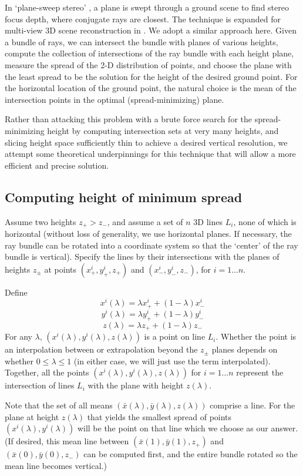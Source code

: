 \documentclass[10pt]{amsart}
\begin{document}
In `plane-sweep stereo' \cite{PLANE_SWEEP}, a plane is swept through a ground
scene to find stereo focus depth, where conjugate rays are closest. The
technique is expanded for multi-view 3D scene reconstruction in
\cite{PLANE_COLLINS}. We adopt a similar approach here. Given a bundle of rays,
we can intersect the bundle with planes of various heights, compute the
collection of intersections of the ray bundle with each height plane, measure
the spread of the 2-D distribution of points, and choose the plane with the
least spread to be the solution for the height of the desired ground point. For
the horizontal location of the ground point, the natural choice is the mean of
the intersection points in the optimal (spread-minimizing) plane.

Rather than attacking this problem with a brute force search for the
spread-minimizing height by computing intersection sets at very many heights,
and slicing height space sufficiently thin to achieve a desired vertical
resolution, we attempt some theoretical underpinnings for this technique that
will allow a more efficient and precise solution.

\subsection{Computing height of minimum spread\label{poly}}
Assume two heights $z_{+} > z_{-}$, and assume a set of $n$ 3D lines $L_i$, none
of which is horizontal (without loss of generality, we use horizontal planes. If
necessary, the ray bundle can be rotated into a coordinate system so that the
`center' of the ray bundle is vertical). Specify the lines by their
intersections with the planes of heights $z_\pm$ at points
$(x_{+}^{i},y_{+}^{i}, z_+)$ and $(x_{-}^{i},y_{-}^{i}, z_-)$, for $i=1\ldots
n$.

Define
$$x^i(\lambda) = \lambda x^i_+ + (1-\lambda) x^i_-$$
$$y^i(\lambda) = \lambda y^i_+ + (1-\lambda) y^i_-$$
$$z(\lambda) = \lambda z_+ + (1-\lambda) z_-$$ For any $\lambda$,
$(x^i(\lambda), y^i(\lambda), z(\lambda))$ is a point on line $L_i$. Whether the
point is an interpolation between or extrapolation beyond the $z_\pm$ planes
depends on whether $0\le\lambda\le 1$ (in either case, we will just use the term
interpolated). Together, all the points $(x^i(\lambda), y^i(\lambda),
z(\lambda))$ for $i=1\ldots n$ represent the intersection of lines $L_i$ with
the plane with height $z(\lambda)$.

Note that the set of all means $(\bar{x}(\lambda),\bar{y}(\lambda),z(\lambda))$
comprise a line. For the plane at height $z(\lambda)$ that yields the smallest
spread of points $(x^i(\lambda),y^i(\lambda))$ will be the point on that line
which we choose as our answer. (If desired, this mean line between $(\bar{x}(1),
\bar{y}(1),z_+)$ and $(\bar{x}(0),\bar{y}(0),z_-)$ can be computed first, and
the entire bundle rotated so the mean line becomes vertical.)
\end{document}
